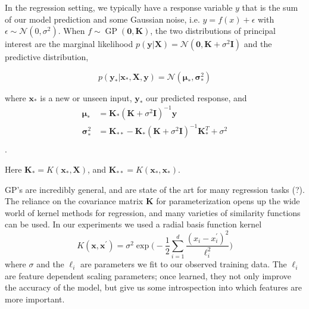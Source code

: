 In the regression setting, we typically have a response variable $y$ that
is the sum of our model prediction  and 
some Gaussian noise, i.e. $y = f(x) + \epsilon$ with 
$\epsilon \sim \mathcal{N}(0, \sigma^2)$. When
$f \sim \operatorname{GP}(\mathbf{0}, \mathbf{K})$, the
two distributions
of principal interest are the marginal likelihood
$p(\mathbf{y}|\mathbf{X}) = 
\mathcal{N}(\mathbf{0},\mathbf{K} + \sigma^2\mathbf{I})$ and the predictive
distribution,

$$p(\mathbf{y_*}|\mathbf{x_*},\mathbf{X},\mathbf{y}) =
\mathcal{N}(\boldsymbol{\mu}_*, \boldsymbol{\sigma}^2_*) $$

where $\mathbf{x_*}$ is a new or unseen input, $\mathbf{y_*}$ our predicted
response, and
\begin{align*}
\boldsymbol{\mu}_* & = \mathbf{K_*}(\mathbf{K} + \sigma^2\mathbf{I})^{-1}\mathbf{y} \\
\boldsymbol{\sigma}^2_* & 
= \mathbf{K}_{**} - \mathbf{K}_*(\mathbf{K} + \sigma^2\mathbf{I})^{-1}
\mathbf{K}_*^T + \sigma^2\\
\end{align*}.

Here $\mathbf{K}_* = K(\mathbf{x}_*, \mathbf{X})$, and 
$\mathbf{K}_{**} = K(\mathbf{x}_*, \mathbf{x}_*)$.


GP's are incredibly general, and are state of the art for many regression 
tasks (?). The reliance on the covariance matrix 
$\mathbf{K}$ for parameterization opens up the wide world of kernel methods
for regression, and many varieties of similarity functions can be used.
In our experiments we used a radial basis function kernel 
$$K(\mathbf{x},\mathbf{x}^\prime) = \sigma^2 \exp\bigg(- \frac{1}{2} 
\sum_{i=1}^d \frac{ (x_i-x^\prime_i)^2}{\ell_i^2} \bigg)$$ where 
$\sigma$ and the $\ell_i$ are parameters we fit to our observed training data.
The $\ell_i$ are feature dependent scaling parameters; once learned, they not
only improve the accuracy of the model, but give us some introspection 
into which features are more important.





